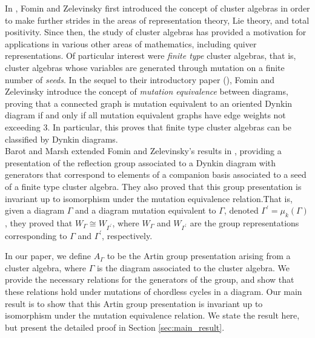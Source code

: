 \documentclass[11pt]{amsart}
\newtheorem{thm}{Theorem}[section]
\theoremstyle{definition}
\begin{document}
In \cite{FZ02}, Fomin and Zelevinsky first introduced the concept of cluster algebras in order to make further strides in the areas of representation theory, Lie theory, and total positivity. Since then, the study of cluster algebras has provided a motivation for applications in various other areas of mathematics, including quiver representations. Of particular interest were \textit{finite type} cluster algebras, that is, cluster algebras whose variables are generated through mutation on a finite number of \textit{seeds}. In the sequel to their introductory paper (\cite{FZ03}), Fomin and Zelevinsky introduce the concept of \textit{mutation equivalence} between diagrams, proving that a connected graph is mutation equivalent to an oriented Dynkin diagram if and only if all mutation equivalent graphs have edge weights not exceeding 3. In particular, this proves that finite type cluster algebras can be classified by Dynkin diagrams. \\
\indent Barot and Marsh extended Fomin and Zelevinsky's results in \cite{BM13}, providing a presentation of the reflection group associated to a Dynkin diagram with generators that correspond to elements of a companion basis associated to a seed of a finite type cluster algebra. They also proved that this group presentation is invariant up to isomorphism under the mutation equivalence relation.That is, given a diagram $\Gamma$ and a diagram mutation equivalent to $\Gamma$, denoted $\Gamma^{\prime} = \mu_k(\Gamma)$, they proved that $W_{\Gamma} \cong W_{\Gamma^{\prime}}$, where $W_{\Gamma}$ and $W_{\Gamma^{\prime}}$ are the group representations corresponding to $\Gamma$ and $\Gamma^{\prime}$, respectively.




In our paper, we define $A_{\Gamma}$ to be the Artin group presentation arising from a cluster algebra, where $\Gamma$ is the diagram associated to the cluster algebra. We provide the necessary relations for the generators of the group, and show that these relations hold under mutations of chordless cycles in a diagram. Our main result is to show that this Artin group presentation is invariant up to isomorphism under the mutation equivalence relation. We state the result here, but present the detailed proof in Section \ref{sec:main_result}.
\end{document}
